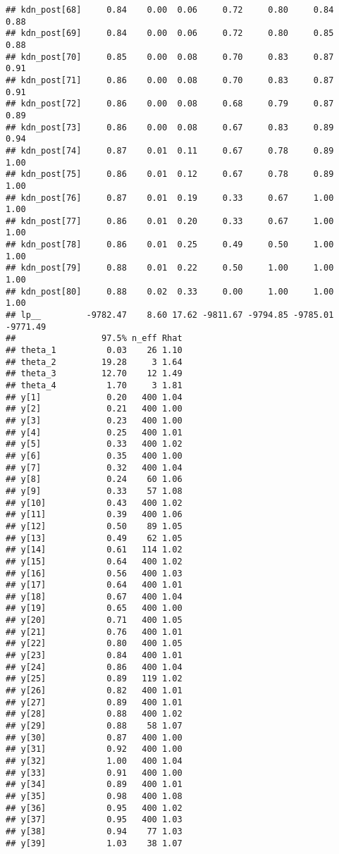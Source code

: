 \documentclass{article}\usepackage[]{graphicx}\usepackage[]{color}
\makeatletter
\newenvironment{kframe}{%
 \def\at@end@of@kframe{}%
 \ifinner\ifhmode%
  \def\at@end@of@kframe{\end{minipage}}%
  \begin{minipage}{\columnwidth}%
 \fi\fi%
 \def\FrameCommand##1{\hskip\@totalleftmargin \hskip-\fboxsep
 \colorbox{shadecolor}{##1}\hskip-\fboxsep
     \hskip-\linewidth \hskip-\@totalleftmargin \hskip\columnwidth}%
 \MakeFramed {\advance\hsize-\width
   \@totalleftmargin\z@ \linewidth\hsize
   \@setminipage}}%
 {\par\unskip\endMakeFramed%
 \at@end@of@kframe}
\newenvironment{knitrout}{}{} %
\makeatother
\begin{document}
\begin{knitrout}
\begin{kframe}
\begin{verbatim}
## kdn_post[68]     0.84    0.00  0.06     0.72     0.80     0.84     0.88
## kdn_post[69]     0.84    0.00  0.06     0.72     0.80     0.85     0.88
## kdn_post[70]     0.85    0.00  0.08     0.70     0.83     0.87     0.91
## kdn_post[71]     0.86    0.00  0.08     0.70     0.83     0.87     0.91
## kdn_post[72]     0.86    0.00  0.08     0.68     0.79     0.87     0.89
## kdn_post[73]     0.86    0.00  0.08     0.67     0.83     0.89     0.94
## kdn_post[74]     0.87    0.01  0.11     0.67     0.78     0.89     1.00
## kdn_post[75]     0.86    0.01  0.12     0.67     0.78     0.89     1.00
## kdn_post[76]     0.87    0.01  0.19     0.33     0.67     1.00     1.00
## kdn_post[77]     0.86    0.01  0.20     0.33     0.67     1.00     1.00
## kdn_post[78]     0.86    0.01  0.25     0.49     0.50     1.00     1.00
## kdn_post[79]     0.88    0.01  0.22     0.50     1.00     1.00     1.00
## kdn_post[80]     0.88    0.02  0.33     0.00     1.00     1.00     1.00
## lp__         -9782.47    8.60 17.62 -9811.67 -9794.85 -9785.01 -9771.49
##                 97.5% n_eff Rhat
## theta_1          0.03    26 1.10
## theta_2         19.28     3 1.64
## theta_3         12.70    12 1.49
## theta_4          1.70     3 1.81
## y[1]             0.20   400 1.04
## y[2]             0.21   400 1.00
## y[3]             0.23   400 1.00
## y[4]             0.25   400 1.01
## y[5]             0.33   400 1.02
## y[6]             0.35   400 1.00
## y[7]             0.32   400 1.04
## y[8]             0.24    60 1.06
## y[9]             0.33    57 1.08
## y[10]            0.43   400 1.02
## y[11]            0.39   400 1.06
## y[12]            0.50    89 1.05
## y[13]            0.49    62 1.05
## y[14]            0.61   114 1.02
## y[15]            0.64   400 1.02
## y[16]            0.56   400 1.03
## y[17]            0.64   400 1.01
## y[18]            0.67   400 1.04
## y[19]            0.65   400 1.00
## y[20]            0.71   400 1.05
## y[21]            0.76   400 1.01
## y[22]            0.80   400 1.05
## y[23]            0.84   400 1.01
## y[24]            0.86   400 1.04
## y[25]            0.89   119 1.02
## y[26]            0.82   400 1.01
## y[27]            0.89   400 1.01
## y[28]            0.88   400 1.02
## y[29]            0.88    58 1.07
## y[30]            0.87   400 1.00
## y[31]            0.92   400 1.00
## y[32]            1.00   400 1.04
## y[33]            0.91   400 1.00
## y[34]            0.89   400 1.01
## y[35]            0.98   400 1.08
## y[36]            0.95   400 1.02
## y[37]            0.95   400 1.03
## y[38]            0.94    77 1.03
## y[39]            1.03    38 1.07

\end{verbatim}
\end{kframe}
\end{knitrout}
\end{document}
